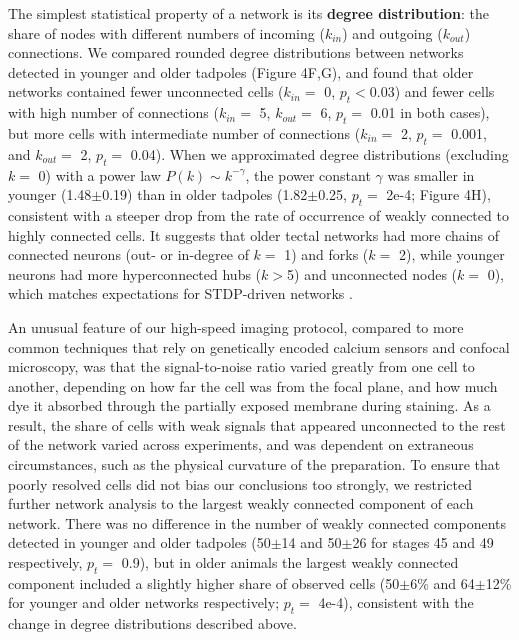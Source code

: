 \documentclass{article}
\begin{document}
The simplest statistical property of a network is its \textbf{degree distribution}: the share of nodes with different numbers of incoming ($k_{in}$) and outgoing ($k_{out}$) connections. We compared rounded degree distributions between networks detected in younger and older tadpoles (Figure 4F,G), and found that older networks contained fewer unconnected cells ($k_{in}=$ 0, $p_t<$0.03) and fewer cells with high number of connections ($k_{in}=$ 5, $k_{out}=$ 6, $p_t=$ 0.01 in both cases), but more cells with intermediate number of connections ($k_{in}=$ 2, $p_t=$ 0.001, and $k_{out}=$ 2, $p_t=$ 0.04). When we approximated degree distributions (excluding $k=$ 0) with a power law $P(k) \sim k^{-\gamma}$, the power constant $\gamma$ was smaller in younger (1.48$\pm$0.19) than in older tadpoles (1.82$\pm$0.25, $p_t=$ 2e-4; Figure 4H), consistent with a steeper drop from the rate of occurrence of weakly connected to highly connected cells. It suggests that older tectal networks had more chains of connected neurons (out- or in-degree of $k=$ 1) and forks ($k=$ 2), while younger neurons had more hyperconnected hubs ($k>$5) and unconnected nodes ($k=$ 0), which matches expectations for STDP-driven networks \citep{fiete2010chains}.

An unusual feature of our high-speed imaging protocol, compared to more common techniques that rely on genetically encoded calcium sensors and confocal microscopy, was that the signal-to-noise ratio varied greatly from one cell to another, depending on how far the cell was from the focal plane, and how much dye it absorbed through the partially exposed membrane during staining. As a result, the share of cells with weak signals that appeared unconnected to the rest of the network varied across experiments, and was dependent on extraneous circumstances, such as the physical curvature of the preparation. To ensure that poorly resolved cells did not bias our conclusions too strongly, we restricted further network analysis to the largest weakly connected component of each network. There was no difference in the number of weakly connected components detected in younger and older tadpoles (50$\pm$14 and 50$\pm$26 for stages 45 and 49 respectively, $p_t=$ 0.9), but in older animals the largest weakly connected component included a slightly higher share of observed cells (50$\pm$6\% and 64$\pm$12\% for younger and older networks respectively; $p_t=$ 4e-4), consistent with the change in degree distributions described above.
\end{document}
